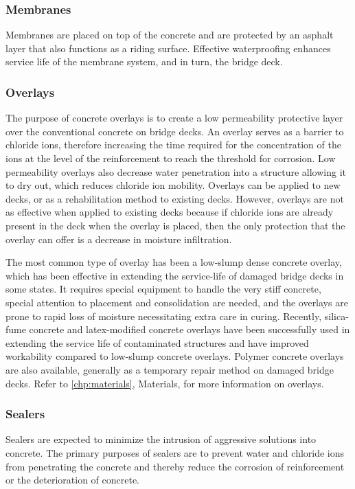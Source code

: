 \subsubsection{Membranes}
Membranes are placed on top of the concrete and are protected by an asphalt layer that also functions as a riding surface. Effective waterproofing enhances service life of the membrane system, and in turn, the bridge deck.

\subsubsection{Overlays}
The purpose of concrete overlays is to create a low permeability protective layer over the conventional concrete on bridge decks. An overlay serves as a barrier to chloride ions, therefore increasing the time required for the concentration of the ions at the level of the reinforcement to reach the threshold for corrosion. Low permeability overlays also decrease water penetration into a structure allowing it to dry out, which reduces chloride ion mobility. Overlays can be applied to new decks, or as a rehabilitation method to existing decks. However, overlays are not as effective when applied to existing decks because if chloride ions are already present in the deck when the overlay is placed, then the only protection that the overlay can offer is a decrease in moisture infiltration.

The most common type of overlay has been a low-slump dense concrete overlay, which has been effective in extending the service-life of damaged bridge decks in some states. It requires special equipment to handle the very stiff concrete, special attention to placement and consolidation are needed, and the overlays are prone to rapid loss of moisture necessitating extra care in curing. Recently, silica-fume concrete and latex-modified concrete overlays have been successfully used in extending the service life of contaminated structures and have improved workability compared to low-slump concrete overlays. Polymer concrete overlays are also available, generally as a temporary repair method on damaged bridge decks. Refer to \cref{chp:materials}, Materials, for more information on overlays.

\subsubsection{Sealers}
Sealers are expected to minimize the intrusion of aggressive solutions into concrete. The primary purposes of sealers are to prevent water and chloride ions from penetrating the concrete and thereby reduce the corrosion of reinforcement or the deterioration of concrete.

